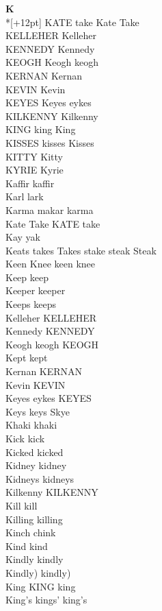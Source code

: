 \vspace{14pt}
\noindent\textbf{\Large K}\\*[+12pt]
KATE take Kate Take\\
KELLEHER Kelleher\\
KENNEDY Kennedy\\
KEOGH Keogh keogh\\
KERNAN Kernan\\
KEVIN Kevin\\
KEYES Keyes eykes\\
KILKENNY Kilkenny\\
KING king King\\
KISSES kisses Kisses\\
KITTY Kitty\\
KYRIE Kyrie\\
Kaffir kaffir\\
Karl lark\\
Karma makar karma\\
Kate Take KATE take\\
Kay yak\\
Keats takes Takes stake steak Steak\\
Keen Knee keen knee\\
Keep keep\\
Keeper keeper\\
Keeps keeps\\
Kelleher KELLEHER\\
Kennedy KENNEDY\\
Keogh keogh KEOGH\\
Kept kept\\
Kernan KERNAN\\
Kevin KEVIN\\
Keyes eykes KEYES\\
Keys keys Skye\\
Khaki khaki\\
Kick kick\\
Kicked kicked\\
Kidney kidney\\
Kidneys kidneys\\
Kilkenny KILKENNY\\
Kill kill\\
Killing killing\\
Kinch chink\\
Kind kind\\
Kindly kindly\\
Kindly) kindly)\\
King KING king\\
King's kings' king's\\
